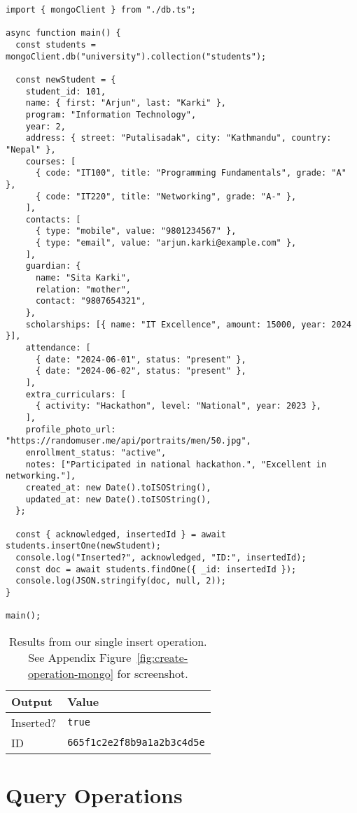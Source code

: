 \begin{verbatim}
import { mongoClient } from "./db.ts";

async function main() {
  const students = mongoClient.db("university").collection("students");

  const newStudent = {
    student_id: 101,
    name: { first: "Arjun", last: "Karki" },
    program: "Information Technology",
    year: 2,
    address: { street: "Putalisadak", city: "Kathmandu", country: "Nepal" },
    courses: [
      { code: "IT100", title: "Programming Fundamentals", grade: "A" },
      { code: "IT220", title: "Networking", grade: "A-" },
    ],
    contacts: [
      { type: "mobile", value: "9801234567" },
      { type: "email", value: "arjun.karki@example.com" },
    ],
    guardian: {
      name: "Sita Karki",
      relation: "mother",
      contact: "9807654321",
    },
    scholarships: [{ name: "IT Excellence", amount: 15000, year: 2024 }],
    attendance: [
      { date: "2024-06-01", status: "present" },
      { date: "2024-06-02", status: "present" },
    ],
    extra_curriculars: [
      { activity: "Hackathon", level: "National", year: 2023 },
    ],
    profile_photo_url: "https://randomuser.me/api/portraits/men/50.jpg",
    enrollment_status: "active",
    notes: ["Participated in national hackathon.", "Excellent in networking."],
    created_at: new Date().toISOString(),
    updated_at: new Date().toISOString(),
  };

  const { acknowledged, insertedId } = await students.insertOne(newStudent);
  console.log("Inserted?", acknowledged, "ID:", insertedId);
  const doc = await students.findOne({ _id: insertedId });
  console.log(JSON.stringify(doc, null, 2));
}

main();
\end{verbatim}

\begin{table}[H]
  \centering
  \begin{tabular}{|l|l|}
    \hline
    \textbf{Output} & \textbf{Value} \\
    \hline
    Inserted? & \texttt{true} \\
    \hline
    ID & \texttt{665f1c2e2f8b9a1a2b3c4d5e} \\
    \hline
  \end{tabular}
  \caption{Results from our single insert operation. See Appendix Figure~\ref{fig:create-operation-mongo} for screenshot.}
\end{table}

\section{Query Operations}

